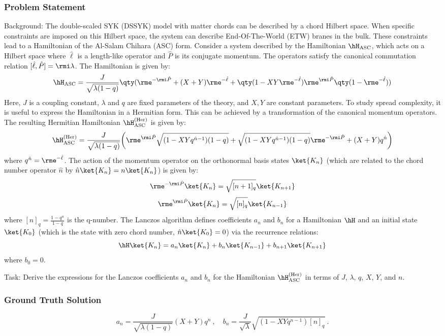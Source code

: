 \documentclass[10pt]{article}
\begin{document}
\subsubsection*{Problem Statement}
Background:
The double-scaled SYK (DSSYK) model with matter chords can be described by a chord Hilbert space. When specific constraints are imposed on this Hilbert space, the system can describe End-Of-The-World (ETW) branes in the bulk. These constraints lead to a Hamiltonian of the Al-Salam Chihara (ASC) form.
Consider a system described by the Hamiltonian $\hH_{\rm ASC}$, which acts on a Hilbert space where $\hat{\ell}$ is a length-like operator and $\hat{P}$ is its conjugate momentum. The operators satisfy the canonical commutation relation $[\hat{\ell}, \hat{P}] = \rmi \lambda$. The Hamiltonian is given by:
$$ \hH_{\rm ASC}=\frac{J}{\sqrt{\lambda(1-q)}}\qty(\rme^{-\rmi \hat{P}}+(X+Y)\rme^{-\hat{\ell}}+\qty(1-XY\rme^{-\hat{\ell}})\rme^{\rmi \hat{P}}\qty(1-\rme^{-\hat{\ell}})) $$
Here, $J$ is a coupling constant, $\lambda$ and $q$ are fixed parameters of the theory, and $X, Y$ are constant parameters.
To study spread complexity, it is useful to express the Hamiltonian in a Hermitian form. This can be achieved by a transformation of the canonical momentum operators. The resulting Hermitian Hamiltonian $\hH^{(\rm Her)}_{\rm ASC}$ is given by:
$$ \hH^{(\rm Her)}_{\rm ASC}=\frac{J}{\sqrt{\lambda(1-q)}}\biggl(\rme^{\rmi\hat{P}}\sqrt{(1-XY q^{\hat{n}-1})(1-q)} +\sqrt{(1-XY q^{\hat{n}-1})(1-q)}\rme^{-\rmi\hat{P}}+(X+Y)q^{\hat{n}}\biggr) $$
where $q^{\hat{n}}=\rme^{-\hat{\ell}}$.
The action of the momentum operator on the orthonormal basis states $\ket{K_n}$ (which are related to the chord number operator $\hat{n}$ by $\hat{n}\ket{K_n}=n\ket{K_n}$) is given by:
$$ \rme^{-\rmi\hat{P}}\ket{K_n}=\sqrt{[n+ 1]_q}\ket{K_{n+1}} $$
$$ \rme^{\rmi\hat{P}}\ket{K_n}=\sqrt{[n]_q}\ket{K_{n-1}} $$
where $[n]_q = \frac{1-q^n}{1-q}$ is the q-number.
The Lanczos algorithm defines coefficients $a_n$ and $b_n$ for a Hamiltonian $\hH$ and an initial state $\ket{K_0}$ (which is the state with zero chord number, $\hat{n}\ket{K_0}=0$) via the recurrence relations:
$$ \hH\ket{K_n} = a_n\ket{K_n} + b_n\ket{K_{n-1}} + b_{n+1}\ket{K_{n+1}} $$
where $b_0=0$.

Task:
Derive the expressions for the Lanczos coefficients $a_n$ and $b_n$ for the Hamiltonian $\hH^{(\rm Her)}_{\rm ASC}$ in terms of $J$, $\lambda$, $q$, $X$, $Y$, and $n$.

\subsubsection*{Ground Truth Solution}
\[ \boxed{a_n=\frac{J}{\sqrt{\lambda(1-q)}}(X+Y)q^n~,\quad b_n=\frac{J}{\sqrt{\lambda}}\sqrt{(1-XYq^{n-1})[n]_q}~.} \]
\end{document}
